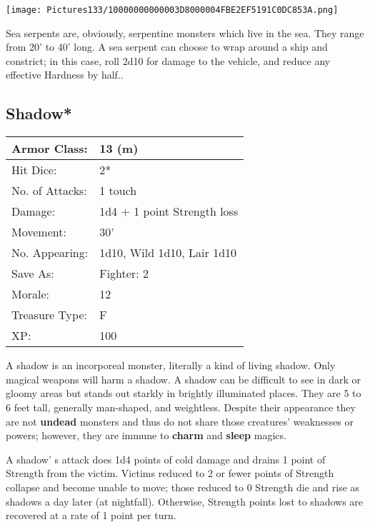 \documentclass[a4paper,twoside,openany,10pt]{book}
\begin{document}
\begin{multicols}{2}
\begin{center} \texttt{[image: Pictures133/10000000000003D8000004FBE2EF5191C0DC853A.png]} \end{center}

Sea serpents are, obviously, serpentine monsters which live in the sea. They range from 20' to 40' long. A sea serpent can choose to wrap around a ship and constrict; in this case, roll 2d10 for damage to the vehicle, and reduce any effective Hardness by half..


\subsection*{Shadow*}\label{shadow}

\begin{tabularx}{0.50\textwidth}{@{}lX@{}}
Armor Class: & 13 (m) \\\hline
Hit Dice: & 2* \\\hline
No. of Attacks: & 1 touch \\\hline
Damage: & 1d4 + 1 point Strength loss \\\hline
Movement: & 30' \\\hline
No. Appearing: & 1d10, Wild 1d10, Lair 1d10 \\\hline
Save As: & Fighter: 2 \\\hline
Morale: & 12 \\\hline
Treasure Type: & F \\\hline
XP: & 100 \\\hline
\end{tabularx}\medskip

A shadow is an incorporeal monster, literally a kind of living shadow. Only magical weapons will harm a shadow. A shadow can be difficult to see in dark or gloomy areas but stands out starkly in brightly illuminated places. They are 5 to 6 feet tall, generally man-shaped, and weightless. Despite their appearance they are not \textbf{undead} monsters and thus do not share those creatures' weaknesses or powers; however, they are immune to \textbf{charm }and \textbf{sleep }magics.

A shadow' s attack does 1d4 points of cold damage and drains 1 point of Strength from the victim. Victims reduced to 2 or fewer points of Strength collapse and become unable to move; those reduced to 0 Strength die and rise as shadows a day later (at nightfall). Otherwise, Strength points lost to shadows are recovered at a rate of 1 point per turn.


\end{multicols}
\end{document}
